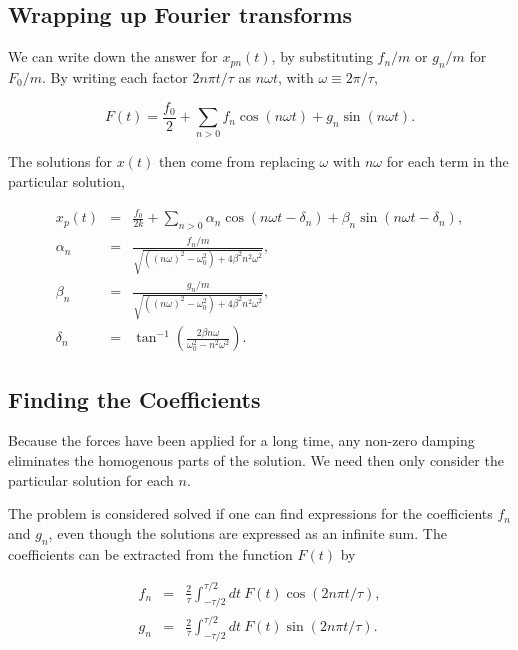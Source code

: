 \documentclass[%
oneside,                 %
final,                   %
10pt]{article}
\begin{document}
\subsection{Wrapping up Fourier transforms}

We can write down the answer for
$x_{pn}(t)$, by substituting $f_n/m$ or $g_n/m$ for $F_0/m$. By
writing each factor $2n\pi t/\tau$ as $n\omega t$, with $\omega\equiv
2\pi/\tau$,

\begin{equation}
\label{eq:fourierdef1}
F(t)=\frac{f_0}{2}+\sum_{n>0}f_n\cos(n\omega t)+g_n\sin(n\omega t).
\end{equation}

The solutions for $x(t)$ then come from replacing $\omega$ with
$n\omega$ for each term in the particular solution,

\begin{eqnarray}
x_p(t)&=&\frac{f_0}{2k}+\sum_{n>0} \alpha_n\cos(n\omega t-\delta_n)+\beta_n\sin(n\omega t-\delta_n),\\
\nonumber
\alpha_n&=&\frac{f_n/m}{\sqrt{((n\omega)^2-\omega_0^2)+4\beta^2n^2\omega^2}},\\
\nonumber
\beta_n&=&\frac{g_n/m}{\sqrt{((n\omega)^2-\omega_0^2)+4\beta^2n^2\omega^2}},\\
\nonumber
\delta_n&=&\tan^{-1}\left(\frac{2\beta n\omega}{\omega_0^2-n^2\omega^2}\right).
\end{eqnarray}

\subsection{Finding the Coefficients}

Because the forces have been applied for a long time, any non-zero
damping eliminates the homogenous parts of the solution. We need then 
only consider the particular solution for each $n$.

The problem is considered solved if one can find expressions for the
coefficients $f_n$ and $g_n$, even though the solutions are expressed
as an infinite sum. The coefficients can be extracted from the
function $F(t)$ by

\begin{eqnarray}
\label{eq:fourierdef2}
f_n&=&\frac{2}{\tau}\int_{-\tau/2}^{\tau/2} dt~F(t)\cos(2n\pi t/\tau),\\
\nonumber
g_n&=&\frac{2}{\tau}\int_{-\tau/2}^{\tau/2} dt~F(t)\sin(2n\pi t/\tau).
\end{eqnarray}
\end{document}
